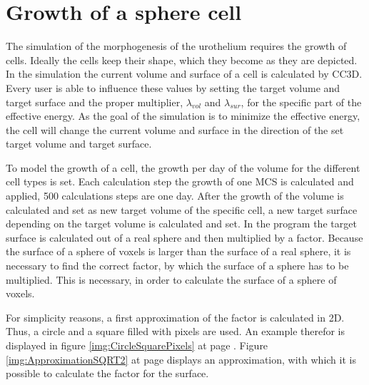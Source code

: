 \section{Growth of a sphere cell}\label{sec:GrowSphereCell}
The simulation of the morphogenesis of the urothelium requires the growth of cells. Ideally the cells keep their shape, which they become as they are depicted. \newline
In the simulation the current volume and surface of a cell is calculated by \ac{CC3D}. Every user is able to influence these values by setting the target volume and target surface and the proper multiplier, $\lambda_{vol}$ and $\lambda_{sur}$, for the specific part of the effective energy. As the goal of the simulation is to minimize the effective energy, the cell will change the current volume and surface in the direction of the set target volume and target surface. 

To model the growth of a cell, the growth per day of the volume for the different cell types is set. Each calculation step the growth of one \ac{MCS} is calculated and applied, 500 calculations steps are one day. After the growth of the volume is calculated and set as new target volume of the specific cell, a new target surface depending on the target volume is calculated and set. \newline
In the program the target surface is calculated out of a real sphere and then multiplied by a factor.
Because the surface of a sphere of voxels is larger than the surface of a real sphere, it is necessary to find the correct factor, by which the surface of a sphere has to be multiplied. This is necessary, in order to calculate the surface of a sphere of voxels. 

For simplicity reasons, a first approximation of the factor is calculated in 2D. Thus, a circle and a square filled with pixels are used. An example therefor is displayed in figure \ref{img:CircleSquarePixels} at page \pageref{img:CircleSquarePixels}. \newline
Figure \ref{img:ApproximationSQRT2} at page \pageref{img:ApproximationSQRT2} displays an approximation, with which it is possible to calculate the factor for the surface. 

